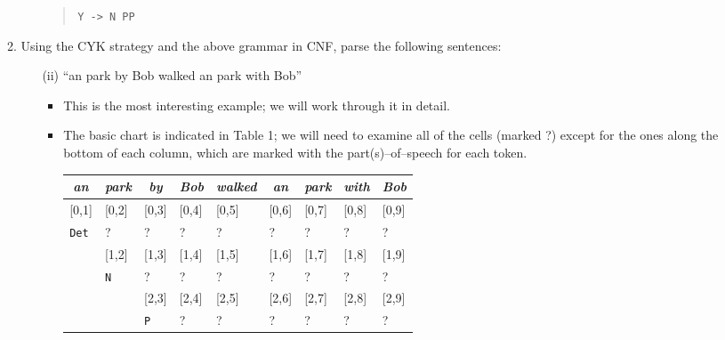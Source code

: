 \documentclass[a4paper]{article}
\begin{document}
\begin{enumerate}
\begin{enumerate}
\begin{itemize}
\begin{quote}
\texttt{Y -> N PP}
\end{quote}
\end{itemize}
\item Using the CYK strategy and the above grammar in CNF, parse the following sentences:
\begin{enumerate}
\item [(ii)] ``an park by Bob walked an park with Bob''
\begin{itemize}
\item This is the most interesting example; we will work through it in detail.
\item The basic chart is indicated in Table 1; we will need to examine all of the cells (marked ?) except for the ones along the bottom of each column, which are marked with the part(s)--of--speech for each token.
\begin{table}[hp]
\centering
\begin{tabular}{ccccccccc}
\textit{an} & \textit{park} & \textit{by} & \textit{Bob} & \textit{walked} & \textit{an} & \textit{park} & \textit{with} & \textit{Bob}\\
\hline
\multicolumn{1}{|l|}{[0,1]} & \multicolumn{1}{l|}{[0,2]} & \multicolumn{1}{l|}{[0,3]} & \multicolumn{1}{l|}{[0,4]} & \multicolumn{1}{l|}{[0,5]} & \multicolumn{1}{l|}{[0,6]} & \multicolumn{1}{l|}{[0,7]} & \multicolumn{1}{l|}{[0,8]} & \multicolumn{1}{l|}{[0,9]} \\
\multicolumn{1}{|l|}{\texttt{Det}} & \multicolumn{1}{l|}{?} & \multicolumn{1}{l|}{?} & \multicolumn{1}{l|}{?} & \multicolumn{1}{l|}{?} & \multicolumn{1}{l|}{?} & \multicolumn{1}{l|}{?} & \multicolumn{1}{l|}{?} & \multicolumn{1}{l|}{?} \\
\hline
 & \multicolumn{1}{|l|}{[1,2]} & \multicolumn{1}{l|}{[1,3]} & \multicolumn{1}{l|}{[1,4]} & \multicolumn{1}{l|}{[1,5]} & \multicolumn{1}{l|}{[1,6]} & \multicolumn{1}{l|}{[1,7]} & \multicolumn{1}{l|}{[1,8]} & \multicolumn{1}{l|}{[1,9]} \\
 & \multicolumn{1}{|l|}{\texttt{N}} & \multicolumn{1}{l|}{?} & \multicolumn{1}{l|}{?} & \multicolumn{1}{l|}{?} & \multicolumn{1}{l|}{?} & \multicolumn{1}{l|}{?} & \multicolumn{1}{l|}{?} & \multicolumn{1}{l|}{?} \\
\cline{2-9}
 & & \multicolumn{1}{|l|}{[2,3]} & \multicolumn{1}{l|}{[2,4]} & \multicolumn{1}{l|}{[2,5]} & \multicolumn{1}{l|}{[2,6]} & \multicolumn{1}{l|}{[2,7]} & \multicolumn{1}{l|}{[2,8]} & \multicolumn{1}{l|}{[2,9]} \\
 & & \multicolumn{1}{|l|}{\texttt{P}} & \multicolumn{1}{l|}{?} & \multicolumn{1}{l|}{?} & \multicolumn{1}{l|}{?} & \multicolumn{1}{l|}{?} & \multicolumn{1}{l|}{?} & \multicolumn{1}{l|}{?} \\

\end{tabular}
\end{table}
\end{itemize}
\end{enumerate}
\end{enumerate}
\end{enumerate}
\end{document}
